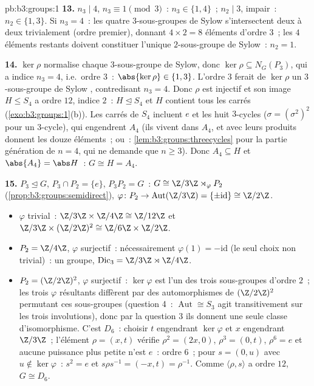 \begin{solution}{pb:b3:groups:1}
\textbf{13.} $n_3 \mid 4$, $n_3 \equiv 1 \pmod 3$~: $n_3 \in
\{1, 4\}$~; $n_2 \mid 3$, impair~: $n_2 \in \{1, 3\}$. Si $n_3
= 4$~: les quatre $3$-sous-groupes de Sylow s'intersectent deux
à deux trivialement (ordre premier), donnant $4 \times 2 = 8$
éléments d'ordre $3$~; les $4$ éléments restants doivent
constituer l'unique $2$-sous-groupe de Sylow~: $n_2 = 1$.

\textbf{14.} $\ker\rho$ normalise chaque $3$-sous-groupe de
Sylow, donc $\ker \rho \subseteq N_G(P_3)$, qui a indice $n_3 =
4$, i.e.\ ordre $3$~: $\abs{\ker\rho} \in \{1, 3\}$. L'ordre $3$
ferait de $\ker\rho$ un $3$-sous-groupe de Sylow
\emph{}, contredisant $n_3 = 4$. Donc $\rho$ est injectif
et son image $H \leq S_4$ a ordre $12$, indice $2$~: $H
\trianglelefteq S_4$ et $H$ contient tous les carrés
(\cref{exo:b3:groups:1}(b)). Les carrés de $S_4$ incluent $e$ et
les huit $3$-cycles ($\sigma = (\sigma^2)^2$ pour un $3$-cycle),
qui engendrent $A_4$ (ils vivent dans $A_4$, et avec leurs
produits donnent les douze éléments~; ou~:
\cref{lem:b3:groups:threecycles} pour la partie génération de $n
= 4$, qui ne demande que $n \geq 3$). Donc $A_4 \subseteq H$ et
$\abs{A_4} = \abs H$~: $G \cong H = A_4$.

\textbf{15.} $P_3 \trianglelefteq G$, $P_3 \cap P_2 = \{e\}$,
$P_3P_2 = G$~: $G \cong \Z/3\Z \rtimes_\varphi P_2$
(\cref{prop:b3:groups:semidirect}), $\varphi \colon P_2 \to
\operatorname{Aut}(\Z/3\Z) = \{\pm\mathrm{id}\} \cong \Z/2\Z$.
\begin{itemize}
  \item $\varphi$ trivial~:  $\Z/3\Z \times
        \Z/4\Z \cong \Z/12\Z$ et $\Z/3\Z \times (\Z/2\Z)^2 \cong
        \Z/6\Z \times \Z/2\Z$.
  \item $P_2 = \Z/4\Z$, $\varphi$ surjectif~: nécessairement
        $\varphi(1) = -\mathrm{id}$ (le seul choix non trivial)~:
        un groupe, $\mathrm{Dic}_3 = \Z/3\Z \rtimes \Z/4\Z$.
  \item $P_2 = (\Z/2\Z)^2$, $\varphi$ surjectif~:
        $\ker\varphi$ est l'un des trois sous-groupes d'ordre
        $2$~; les trois $\varphi$ résultants diffèrent par des
        automorphismes de $(\Z/2\Z)^2$ permutant ces sous-groupes
        (question 4~: $\operatorname{Aut} \cong S_3$ agit
        transitivement sur les trois involutions), donc par la
        question 3 ils donnent une seule classe d'isomorphisme.
        C'est $D_6$~: choisir $t$ engendrant $\ker\varphi$ et $x$
        engendrant $\Z/3\Z$~; l'élément $\rho = (x, t)$ vérifie
        $\rho^2 = (2x, 0)$, $\rho^3 = (0, t)$, $\rho^6 = e$ et
        aucune puissance plus petite n'est $e$~: ordre $6$~; pour
        $s = (0, u)$ avec $u \notin \ker\varphi$~: $s^2 = e$ et
        $s\rho s^{-1} = (-x, t) = \rho^{-1}$. Comme $\langle
        \rho, s\rangle$ a ordre $12$, $G \cong D_6$.
\end{itemize}


\end{solution}

